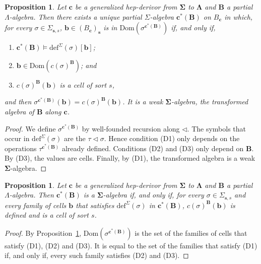 \documentclass[a4paper,reqno]{amsart}
\newcommand{\sig}[1]{\mathbf{#1}}                %
\newcommand{\Dom}{\mathrm{Dom}}
\newcommand{\defi}{\mathrm{def}}
\theoremstyle{plain}
\newtheorem{proposition}[theorem]{Proposition}
\theoremstyle{definition}
\begin{document}
\begin{proposition}\label{PTransformedAlg}
Let $\mathbf{c}$ be a generalized hep-derivor from $\sig{\Sigma}$ to $\sig{\Lambda}$ and $\mathbf{B}$ a partial $\Lambda$-algebra.
Then there exists a unique partial $\Sigma$-algebra $\mathbf{c}^{\ast}(\mathbf{B})$ on $B_{\mathbf{c}}$ in which, for every $\sigma\in\Sigma_{\mathbf{s},s}$, $\mathbf{b}\in(B_{\mathbf{c}})_{\mathbf{s}}$ is in $\Dom(\sigma^{\mathbf{c}^{\ast}(\mathbf{B})})$ if, and only if,
\begin{enumerate}
\item[(D1)] $\mathbf{c}^{\ast}(\mathbf{B})\models\defi^{\Sigma}(\sigma)[\mathbf{b}]$;
\item[(D2)] $\mathbf{b}\in\Dom(c(\sigma)^{\mathbf{B}})$; and
\item[(D3)] $c(\sigma)^{\mathbf{B}}(\mathbf{b})$ is a cell of sort $s$,
\end{enumerate}
and then $\sigma^{\mathbf{c}^{\ast}(\mathbf{B})}(\mathbf{b})=c(\sigma)^{\mathbf{B}}(\mathbf{b})$.
It is a weak $\sig{\Sigma}$-algebra, the \emph{transformed algebra} of $\mathbf{B}$ along $\mathbf{c}$.
\end{proposition}
\begin{proof}
We define $\sigma^{\mathbf{c}^{\ast}(\mathbf{B})}$ by well-founded recursion along $\lhd$.
The symbols that occur in $\defi^{\Sigma}(\sigma)$ are the $\tau\lhd\sigma$.
Hence condition (D1) only depends on the operations $\tau^{\mathbf{c}^{\ast}(\mathbf{B})}$ already defined.
Conditions (D2) and (D3) only depend on $\mathbf{B}$.
By (D3), the values are cells.
Finally, by (D1), the transformed algebra is a weak $\sig{\Sigma}$-algebra.
\end{proof}

\begin{proposition}\label{PTransformedEpAlg}
Let $\mathbf{c}$ be a generalized hep-derivor from $\sig{\Sigma}$ to $\sig{\Lambda}$ and $\mathbf{B}$ a partial $\Lambda$-algebra.
Then $\mathbf{c}^{\ast}(\mathbf{B})$ is a $\sig{\Sigma}$-algebra if, and only if, for every $\sigma\in\Sigma_{\mathbf{s},s}$ and every family of cells $\mathbf{b}$ that satisfies $\defi^{\Sigma}(\sigma)$ in $\mathbf{c}^{\ast}(\mathbf{B})$, $c(\sigma)^{\mathbf{B}}(\mathbf{b})$ is defined and is a cell of sort $s$.
\end{proposition}
\begin{proof}
By Proposition~\ref{PTransformedAlg}, $\Dom(\sigma^{\mathbf{c}^{\ast}(\mathbf{B})})$ is the set of the families of cells that satisfy (D1), (D2) and (D3).
It is equal to the set of the families that satisfy (D1) if, and only if, every such family satisfies (D2) and (D3).
\end{proof}
\end{document}
